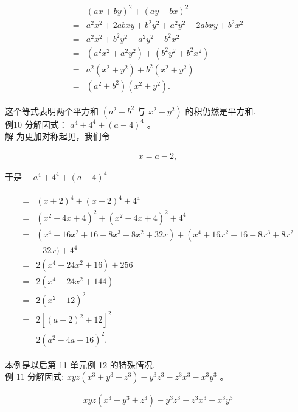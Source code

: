 \documentclass[10pt]{article}
\begin{document}
\begin{align*}
\begin{aligned}
& (a x+b y)^{2}+(a y-b x)^{2} \\
= & a^{2} x^{2}+2 a b x y+b^{2} y^{2}+a^{2} y^{2}-2 a b x y+b^{2} x^{2} \\
= & a^{2} x^{2}+b^{2} y^{2}+a^{2} y^{2}+b^{2} x^{2} \\
= & \left(a^{2} x^{2}+a^{2} y^{2}\right)+\left(b^{2} y^{2}+b^{2} x^{2}\right) \\
= & a^{2}\left(x^{2}+y^{2}\right)+b^{2}\left(x^{2}+y^{2}\right) \\
= & \left(a^{2}+b^{2}\right)\left(x^{2}+y^{2}\right) .
\end{aligned}
\end{align*}

这个等式表明两个平方和 $\left(a^{2}+b^{2}\right.$ 与 $\left.x^{2}+y^{2}\right)$ 的积仍然是平方和.\\
例10 分解因式： $a^{4}+4^{4}+(a-4)^{4}$ 。\\
解 为更加对称起见，我们令

\begin{align*}
x=a-2,
\end{align*}

于是 $\quad a^{4}+4^{4}+(a-4)^{4}$

\begin{align*}
\begin{aligned}
= & (x+2)^{4}+(x-2)^{4}+4^{4} \\
= & \left(x^{2}+4 x+4\right)^{2}+\left(x^{2}-4 x+4\right)^{2}+4^{4} \\
= & \left(x^{4}+16 x^{2}+16+8 x^{3}+8 x^{2}+32 x\right)+\left(x^{4}+16 x^{2}+16-8 x^{3}+8 x^{2}\right. \\
& -32 x)+4^{4} \\
= & 2\left(x^{4}+24 x^{2}+16\right)+256 \\
= & 2\left(x^{4}+24 x^{2}+144\right) \\
= & 2\left(x^{2}+12\right)^{2} \\
= & 2\left[(a-2)^{2}+12\right]^{2} \\
= & 2\left(a^{2}-4 a+16\right)^{2} .
\end{aligned}
\end{align*}

本例是以后第 11 单元例 12 的特殊情况.\\
例 11 分解因式: $x y z\left(x^{3}+y^{3}+z^{3}\right)-y^{3} z^{3}-z^{3} x^{3}-x^{3} y^{3}$ 。

\begin{align*}
x y z\left(x^{3}+y^{3}+z^{3}\right)-y^{3} z^{3}-z^{3} x^{3}-x^{3} y^{3}
\end{align*}
\end{document}

